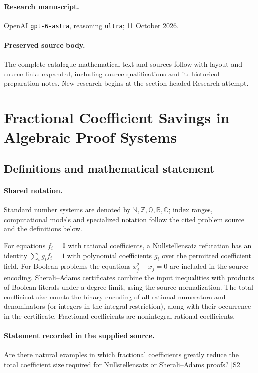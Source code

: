 \documentclass[11pt]{article}
\begin{document}
\paragraph{Research manuscript.} OpenAI \texttt{gpt-6-astra}, reasoning \texttt{ultra}; 11 October 2026.
\paragraph{Preserved source body.} The complete catalogue mathematical text and sources follow with layout and source links expanded, including source qualifications and its historical preparation notes. New research begins at the section headed Research attempt.

\section{Fractional Coefficient Savings in Algebraic Proof Systems}\label{statement}

\subsection{Definitions and mathematical statement}

\paragraph{Shared notation.}Standard number systems are denoted by $\mathbb N,\mathbb Z,\mathbb Q,\mathbb R,\mathbb C$; index ranges, computational models and specialized notation follow the cited problem source and the definitions below.


For equations $f_i=0$ with rational coefficients, a Nullstellensatz refutation has an identity $\sum_i g_i f_i=1$ with polynomial coefficients $g_i$ over the permitted coefficient field. For Boolean problems the equations $x_j^2-x_j=0$ are included in the source encoding. Sherali--Adams certificates combine the input inequalities with products of Boolean literals under a degree limit, using the source normalization. The total coefficient size counts the binary encoding of all rational numerators and denominators (or integers in the integral restriction), along with their occurrence in the certificate. Fractional coefficients are nonintegral rational coefficients.
\paragraph{Statement recorded in the supplied source.}
Are there natural examples in which fractional coefficients greatly reduce the total coefficient size required for Nullstellensatz or Sherali–Adams proofs? \href{https://doi.org/10.4171/owr/2024/15}{[S2]}
\end{document}
